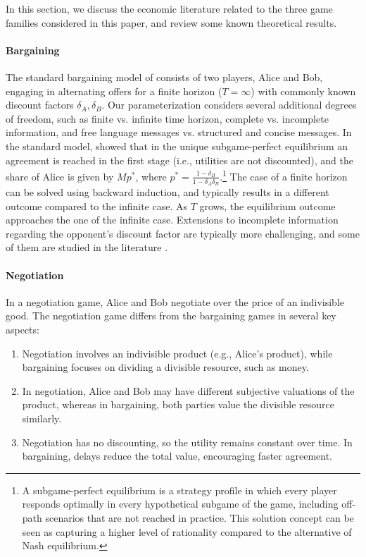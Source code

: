 
In this section, we discuss the economic literature related to the three game families considered in this paper, and review some known theoretical results.

\paragraph{Bargaining}

The standard bargaining model of \cite{rubinstein1982perfect} consists of two players, Alice and Bob, engaging in alternating offers for a finite horizon ($T=\infty$) with commonly known discount factors $\delta_A, \delta_B$. Our parameterization considers several additional degrees of freedom, such as finite vs. infinite time horizon, complete vs. incomplete information, and free language messages vs. structured and concise messages. 
In the standard model, \citet{rubinstein1982perfect} showed that in the unique subgame-perfect equilibrium an agreement is reached in the first stage (i.e., utilities are not discounted), and the share of Alice is given by $M p^*$, where $p^*=\frac{1-\delta_B}{1-\delta_A \delta_B}$.\footnote{A subgame-perfect equilibrium is a strategy profile in which every player responds optimally in every hypothetical subgame of the game, including off-path scenarios that are not reached in practice. This solution concept can be seen as capturing a higher level of rationality compared to the alternative of Nash equilibrium.}
The case of a finite horizon can be solved using backward induction, and typically results in a different outcome compared to the infinite case. As $T$ grows, the equilibrium outcome approaches the one of the infinite case. Extensions to incomplete information regarding the opponent's discount factor are typically more challenging, and some of them are studied in the literature \cite{rubinstein1985bargaining}.


\paragraph{Negotiation}

In a negotiation game, Alice and Bob negotiate over the price of an indivisible good. The negotiation game differs from the bargaining games in several key aspects: 
\begin{enumerate}
    \item Negotiation involves an indivisible product (e.g., Alice’s product), while bargaining focuses on dividing a divisible resource, such as money.
    \item In negotiation, Alice and Bob may have different subjective valuations of the product, whereas in bargaining, both parties value the divisible resource similarly.
    \item Negotiation has no discounting, so the utility remains constant over time. In bargaining, delays reduce the total value, encouraging faster agreement.
\end{enumerate}

